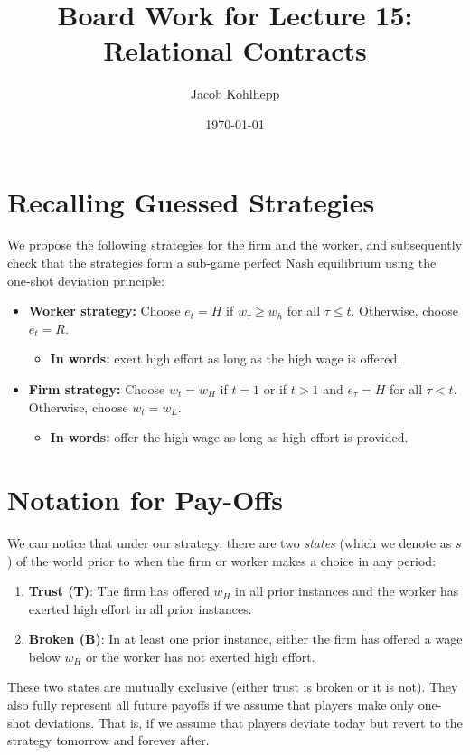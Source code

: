 \documentclass[14pt]{article}
\title{Board Work for Lecture 15: Relational Contracts}
\author{Jacob Kohlhepp}
\date{\today}
\begin{document}
\maketitle



\section{Recalling Guessed Strategies}
We propose the following strategies for the firm and the worker, and subsequently check that the strategies form a sub-game perfect Nash equilibrium using the one-shot deviation principle:

\begin{itemize}
 \item \textbf{Worker strategy:} Choose $e_t=H$ if $w_{\tau}\geq w_h$ for all $\tau \leq t$. Otherwise, choose $e_t=R$.
\begin{itemize}
    \item \textbf{In words:} exert high effort as long as the high wage is offered.
\end{itemize}
\item  \textbf{Firm strategy:} Choose $w_t=w_H$ if $t=1$ or if $t>1$  and $e_{\tau}=H$ for all $\tau < t$. Otherwise, choose $w_t=w_L$.
\begin{itemize}
    \item \textbf{In words:} offer the high wage as long as high effort is provided.
\end{itemize}
\end{itemize}

\section{Notation for Pay-Offs}

We can notice that under our strategy, there are two \textit{states} (which we denote as $s$) of the world prior to when the firm or worker makes a choice in any period:
\begin{enumerate}
    \item \textbf{Trust (T)}: The firm has offered $w_H$ in all prior instances and the worker has exerted high effort in all prior instances.
    \item \textbf{Broken (B)}: In at least one prior instance, either the firm has offered a wage below $w_H$ or the worker has not exerted high effort.
\end{enumerate}
These two states are mutually exclusive (either trust is broken or it is not). They also fully represent all future payoffs if we assume that players make only one-shot deviations. That is, if we assume that players deviate today but revert to the strategy tomorrow and forever after.
\end{document}
